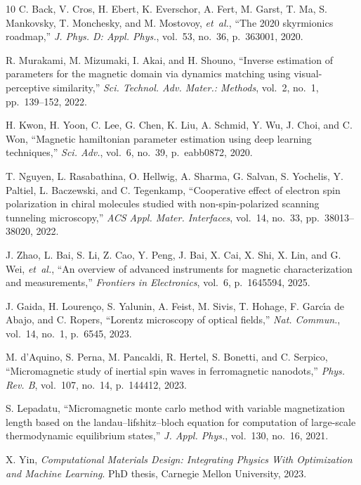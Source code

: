 \documentclass[final,5p,times,twocolumn]{elsarticle}
\begin{document}
\begin{thebibliography}{10}
C. Back, V. Cros, H. Ebert, K. Everschor, A. Fert, M. Garst, T. Ma, S. Mankovsky, T. Monchesky, and M. Mostovoy, {\em et~al.}, ``The 2020 skyrmionics roadmap,'' {\em J. Phys. D: Appl. Phys.}, vol.~53, no.~36, p.~363001, 2020.

R. Murakami, M. Mizumaki, I. Akai, and H. Shouno, ``Inverse estimation of parameters for the magnetic domain via dynamics matching using visual-perceptive similarity,'' {\em Sci. Technol. Adv. Mater.: Methods}, vol.~2, no.~1, pp.~139--152, 2022.

H. Kwon, H. Yoon, C. Lee, G. Chen, K. Liu, A. Schmid, Y. Wu, J. Choi, and C. Won, ``Magnetic hamiltonian parameter estimation using deep learning techniques,'' {\em Sci. Adv.}, vol.~6, no.~39, p.~eabb0872, 2020.

T. Nguyen, L. Rasabathina, O. Hellwig, A. Sharma, G. Salvan, S. Yochelis, Y. Paltiel, L. Baczewski, and C. Tegenkamp, ``Cooperative effect of electron spin polarization in chiral molecules studied with non-spin-polarized scanning tunneling microscopy,'' {\em ACS Appl. Mater. Interfaces}, vol.~14, no.~33, pp.~38013--38020, 2022.

J. Zhao, L. Bai, S. Li, Z. Cao, Y. Peng, J. Bai, X. Cai, X. Shi, X. Lin, and G. Wei, {\em et~al.}, ``An overview of advanced instruments for magnetic characterization and measurements,'' {\em Frontiers in Electronics}, vol.~6, p.~1645594, 2025.

J. Gaida, H. Louren{\c{c}}o, S. Yalunin, A. Feist, M. Sivis, T. Hohage, F. Garc{\'\i}a de Abajo, and C. Ropers, ``Lorentz microscopy of optical fields,'' {\em Nat. Commun.}, vol.~14, no.~1, p.~6545, 2023.

M. d'Aquino, S. Perna, M. Pancaldi, R. Hertel, S. Bonetti, and C. Serpico, ``Micromagnetic study of inertial spin waves in ferromagnetic nanodots,'' {\em Phys. Rev. B}, vol.~107, no.~14, p.~144412, 2023.

S. Lepadatu, ``Micromagnetic monte carlo method with variable magnetization length based on the landau--lifshitz--bloch equation for computation of large-scale thermodynamic equilibrium states,'' {\em J. Appl. Phys.}, vol.~130, no.~16, 2021.

X. Yin, {\em Computational Materials Design: Integrating Physics With Optimization and Machine Learning}.
\newblock PhD thesis, Carnegie Mellon University, 2023.


\end{thebibliography}
\end{document}
